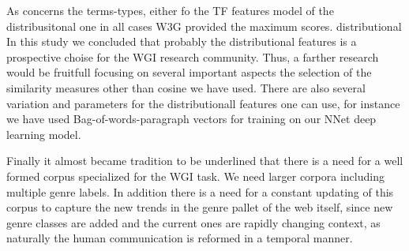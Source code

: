 \documentclass[runningheads]{llncs}
\begin{document}
As concerns the terms-types, either fo the TF features model of the distribusitonal one in all cases W3G provided the maximum scores.
distributional
In this study we concluded that probably the distributional features is a prospective choise for the WGI research community. Thus, a farther research would be fruitfull focusing on several important aspects the selection of the similarity measures other than cosine we have used. There are also several variation and parameters for the distributionall features one can use, for instance we have used Bag-of-words-paragraph vectors for training on our NNet deep learning model.

Finally it almost became tradition to be underlined that there is a need for a well formed corpus specialized for the WGI task. We need larger corpora including multiple genre labels. In addition there is a need for a constant updating of this corpus to capture the new trends in the genre pallet of the web itself, since new genre classes are added and the current ones are rapidly changing context, as naturally the human communication is reformed in a temporal manner.



\end{document}
